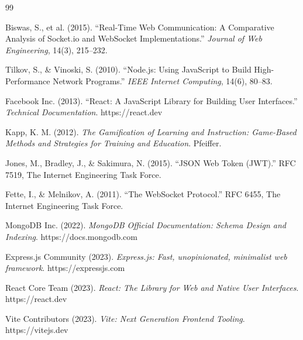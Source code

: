 \documentclass[12pt,a4paper]{report}
\begin{document}
\begin{thebibliography}{99}

Biswas, S., et al. (2015). ``Real-Time Web Communication: A Comparative Analysis of Socket.io and WebSocket Implementations.'' \textit{Journal of Web Engineering}, 14(3), 215--232.

Tilkov, S., \& Vinoski, S. (2010). ``Node.js: Using JavaScript to Build High-Performance Network Programs.'' \textit{IEEE Internet Computing}, 14(6), 80--83.

Facebook Inc. (2013). ``React: A JavaScript Library for Building User Interfaces.'' \textit{Technical Documentation}. https://react.dev

Kapp, K. M. (2012). \textit{The Gamification of Learning and Instruction: Game-Based Methods and Strategies for Training and Education}. Pfeiffer.

Jones, M., Bradley, J., \& Sakimura, N. (2015). ``JSON Web Token (JWT).'' RFC 7519, The Internet Engineering Task Force.

Fette, I., \& Melnikov, A. (2011). ``The WebSocket Protocol.'' RFC 6455, The Internet Engineering Task Force.

MongoDB Inc. (2022). \textit{MongoDB Official Documentation: Schema Design and Indexing}. https://docs.mongodb.com

Express.js Community (2023). \textit{Express.js: Fast, unopinionated, minimalist web framework}. https://expressjs.com

React Core Team (2023). \textit{React: The Library for Web and Native User Interfaces}. https://react.dev

Vite Contributors (2023). \textit{Vite: Next Generation Frontend Tooling}. https://vitejs.dev

\end{thebibliography}
\end{document}
